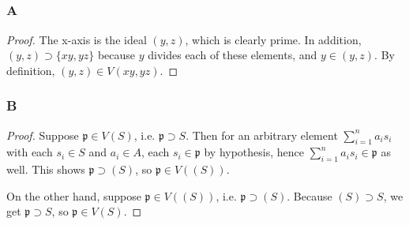 \documentclass{article}
\newcommand{\frkp}{\mathfrak{p}}
\theoremstyle{definition} %
\begin{document}
\subsection{}
\subsection{}
\subsubsection{A}\label{3.4.A}
\begin{proof}
    The x-axis is the ideal $(y,z)$, which is clearly prime. In addition, $(y,z)\supset \{xy, yz\}$ because $y$ divides each of these elements, and $y\in (y,z)$. By definition, $(y,z)\in V(xy,yz)$.
\end{proof}
\subsubsection{B}\label{3.4.B}
\begin{proof}
    Suppose $\frkp \in V(S)$, i.e. $\frkp \supset S$. Then for an arbitrary element $\sum_{i=1}^n a_i s_i$ with each $s_i\in S$ and $a_i\in A$, each $s_i \in \frkp$ by hypothesis, hence $\sum_{i=1}^n a_i s_i\in \frkp$ as well. This shows $\frkp \supset (S)$, so $\frkp \in V((S))$.

    On the other hand, suppose $\frkp \in V((S))$, i.e. $\frkp \supset (S)$. Because $(S)\supset S$, we get $\frkp \supset S$, so $\frkp \in V(S)$.
\end{proof}
\end{document}
